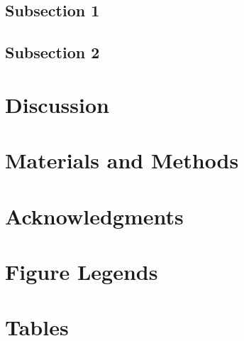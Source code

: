 \documentclass[10pt]{article}
\begin{document}
\subsection*{Subsection 1}

\subsection*{Subsection 2}

\section*{Discussion}

\section*{Materials and Methods}

\section*{Acknowledgments}




\section*{Figure Legends}


\section*{Tables}
\end{document}
